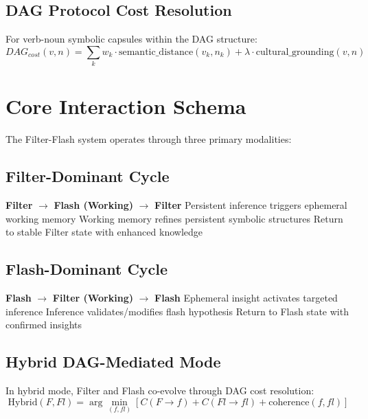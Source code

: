 \documentclass[11pt]{article}
\begin{document}
\subsection{DAG Protocol Cost Resolution}
For verb-noun symbolic capsules within the DAG structure:
\begin{equation}
DAG_{cost}(v, n) = \sum_{k} w_k \cdot \text{semantic\_distance}(v_k, n_k) + \lambda \cdot \text{cultural\_grounding}(v, n)
\end{equation}

\section{Core Interaction Schema}

The Filter-Flash system operates through three primary modalities:

\subsection{Filter-Dominant Cycle}
\begin{algorithmic}
\STATE \textbf{Filter} $\rightarrow$ \textbf{Flash (Working)} $\rightarrow$ \textbf{Filter}
\STATE Persistent inference triggers ephemeral working memory
\STATE Working memory refines persistent symbolic structures
\STATE Return to stable Filter state with enhanced knowledge
\end{algorithmic}

\subsection{Flash-Dominant Cycle}
\begin{algorithmic}
\STATE \textbf{Flash} $\rightarrow$ \textbf{Filter (Working)} $\rightarrow$ \textbf{Flash}
\STATE Ephemeral insight activates targeted inference
\STATE Inference validates/modifies flash hypothesis
\STATE Return to Flash state with confirmed insights
\end{algorithmic}

\subsection{Hybrid DAG-Mediated Mode}
In hybrid mode, Filter and Flash co-evolve through DAG cost resolution:
\begin{equation}
\text{Hybrid}(F, Fl) = \arg\min_{(f,fl)} \left[ C(F \rightarrow f) + C(Fl \rightarrow fl) + \text{coherence}(f, fl) \right]
\end{equation}
\end{document}
